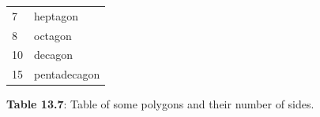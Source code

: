 \begin{table}[H]
{\begin{center}
\begin{xtabular*}{\mytablewidth}[t]{|p{10\mystarwidth}|p{10\mystarwidth}|}
    
        7 &
    
    
        heptagon%
     \tabularnewline{}
    
    
        8 &
    
    
        octagon%
     \tabularnewline{}
    
    
        10 &
    
    
        decagon%
     \tabularnewline{}
    
    
        15 &
    
    
        pentadecagon%
     \tabularnewline{}
    \end{xtabular*}
      \end{center}
    \begin{center}{\small\bfseries Table 13.7}: Table of some polygons and their number of sides.\end{center}
    
}
\end{table}
